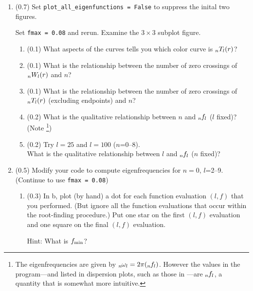 \documentclass[11pt,titlepage,fleqn]{article}
\begin{document}
\begin{enumerate}
\begin{enumerate}
\item Describe the key step used in obtaining these solutions.

\item What is the value of $n$ for the first root that is encountered?

\end{enumerate}


\pagebreak

\item (0.7) Set \verb+plot_all_eigenfunctions = False+ to suppress the inital two figures.

Set \verb+fmax = 0.08+ and rerun. Examine the $3 \times 3$ subplot figure.
%
\begin{enumerate}
\item (0.1) What aspects of the curves tells you which color curve is $\mbox{${}_nT_l$}(r)$?
\item (0.1) What is the relationship between the number of zero crossings of $\mbox{${}_nW_l$}(r)$ and $n$?
\item (0.1) What is the relationship between the number of zero crossings of $\mbox{${}_nT_l$}(r)$ (excluding endpoints) and $n$?
\item (0.2) What is the qualitative relationship between $n$ and $\mbox{${}_{n\hspace{-0.2 mm}}f_l$}$ ($l$ fixed)? (Note \footnote{The eigenfrequencies are given by $\mbox{${}_{n\hspace{-0.2 mm}}\omega_l$} = 2\pi(\mbox{${}_{n\hspace{-0.2 mm}}f_l$})$. However the values in the program---and listed in dispersion plots, such as those in \citet{SteinWysession}---are $\mbox{${}_{n\hspace{-0.2 mm}}f_l$}$, a quantity that is somewhat more intuitive.})
\item (0.2) Try $l=25$ and $l=100$ ($n$=0--8). \\
What is the qualitative relationship between $l$ and $\mbox{${}_{n\hspace{-0.2 mm}}f_l$}$ ($n$ fixed)?
\end{enumerate}


\item (0.5) Modify your code to compute eigenfrequencies for $n=0$, $l$=2--9. (Continue to use \verb+fmax = 0.08+)
%
\begin{enumerate}
\item (0.3) In b, plot (by hand) a dot for each function evaluation $(l, f)$ that you performed. (But ignore all the function evaluations that occur within the root-finding procedure.) Put one star on the first $(l,f)$ evaluation and one square on the final $(l,f)$ evaluation.

Hint: What is $f_{\rm min}$?


\end{enumerate}
\end{enumerate}
\end{document}
